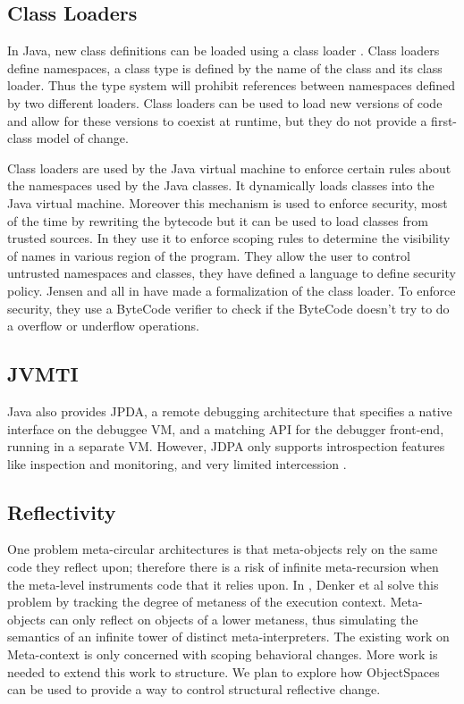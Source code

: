 \subsection*{Class Loaders}
In Java, new class definitions can be loaded using a class loader
\cite{Lian98a}. Class loaders define namespaces, a class type is defined by the
name of the class and its class loader. Thus the type system will prohibit
references between namespaces defined by two different loaders. Class loaders
can be used to load new versions of code and allow for these versions to coexist
at runtime, but they do not provide a first-class model of change.

Class loaders are used by the Java virtual machine to enforce certain rules about the
namespaces used by the Java classes. It dynamically loads classes into the Java
virtual machine. Moreover this mechanism is used to enforce security, most of the time by
rewriting the bytecode but it can be used to load classes from trusted sources. In
\cite{Fong10a} they use it to enforce scoping rules to determine the visibility of
names in various region of the program. They allow the user to control untrusted
namespaces and classes, they have defined a language to define security policy. Jensen and all in 
\cite{Jens98a} have made a formalization of the class loader. To enforce security, they use 
a ByteCode verifier to check if the ByteCode doesn't try to do a overflow or underflow operations.

\subsection*{JVMTI}
Java also provides JPDA, a remote debugging architecture that specifies a native interface on the debuggee VM, and a matching API for the debugger front-end, running in a separate VM. However, JDPA only supports introspection features like  inspection and monitoring, and very limited intercession \cite{jdpa}.

\subsection*{Reflectivity}One problem meta-circular architectures is that meta-objects rely on the same code they reflect upon; therefore there is a risk of infinite meta-recursion when the meta-level instruments code that it relies upon.
In \cite{Denk08b}, Denker et al solve this problem by tracking the degree of metaness of the execution context. Meta-objects can only reflect on objects of a lower metaness, thus simulating the semantics of an infinite tower of distinct meta-interpreters. The existing work on Meta-context is only concerned with scoping behavioral changes. More work is needed to extend this work to structure. We plan to explore how ObjectSpaces can be used to provide a way to control structural reflective change.

